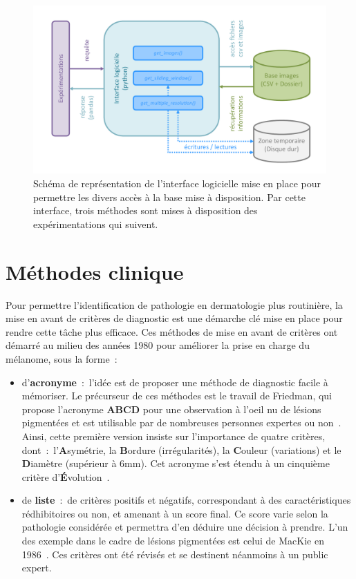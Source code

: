 \begin{figure}[H]
    \centering
    \includegraphics[width=\linewidth]{contents/chapter_4/resources/schema_database_api.pdf}
    \caption{Schéma de représentation de l'interface logicielle mise en place pour permettre les divers accès à la base mise à disposition. Par cette interface, trois méthodes sont mises à disposition des expérimentations qui suivent.}
    \label{fig:schema_database_api}
\end{figure}\par
\clearpage

\section{Méthodes clinique}
\label{sec:clinical_methods}
Pour permettre l'identification de pathologie en dermatologie plus routinière, la mise en avant de critères de diagnostic est une démarche clé mise en place pour rendre cette tâche plus efficace. Ces méthodes de mise en avant de critères ont démarré au milieu des années 1980 pour améliorer la prise en charge du mélanome, sous la forme~:
\begin{itemize}
    \item d'\textbf{acronyme}~:~l'idée est de proposer une méthode de diagnostic facile à mémoriser. Le précurseur de ces méthodes est le travail de Friedman, qui propose l'acronyme \textbf{ABCD} pour une observation à l'oeil nu de lésions pigmentées et est utilisable par de nombreuses personnes expertes ou non~\cite{Friedman1985}. Ainsi, cette première version insiste sur l'importance de quatre critères, dont~:~l'\textbf{A}symétrie, la \textbf{B}ordure (irrégularités), la \textbf{C}ouleur (variations) et le \textbf{D}iamètre (supérieur à 6mm). Cet acronyme s'est étendu à un cinquième critère d'\textbf{É}volution~\cite{Abbasi2004}.
    \item de \textbf{liste}~:~de critères positifs et négatifs, correspondant à des caractéristiques rédhibitoires ou non, et amenant à un score final. Ce score varie selon la pathologie considérée et permettra d'en déduire une décision à prendre. L'un des exemple dans le cadre de lésions pigmentées est celui de MacKie en 1986~\cite{mackie1986}. Ces critères ont été révisés et se destinent néanmoins à un public expert. 
\end{itemize}\par

